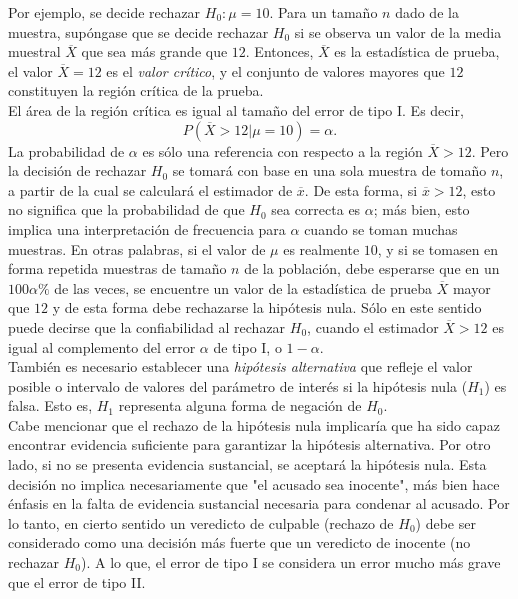 Por ejemplo, se decide rechazar $H_0:\mu =10$. Para un tamaño $n$ dado de la muestra, supóngase que se decide rechazar $H_0$ si se observa un valor de la media muestral $\overline{X}$ que sea más grande que $12$. Entonces, $\overline{X}$ es la estadística de prueba, el valor $\overline{X}=12$ es el \textit{valor crítico}, y el conjunto de valores mayores que $12$ constituyen la región crítica de la prueba. \\
El área de la región crítica es igual al tamaño del error de tipo I. Es decir,
$$P(\overline{X}>12 | \mu = 10)=\alpha.$$
La probabilidad de $\alpha$ es sólo una referencia con respecto a la región $\overline{X}>12$. Pero la decisión de rechazar $H_0$ se tomará con base en una sola muestra de tomaño $n$, a partir de la cual se calculará el estimador de $\overline{x}$. De esta forma, si $\overline{x}>12$, esto no significa que la probabilidad de que $H_0$ sea correcta es $\alpha$; más bien, esto implica una interpretación de frecuencia para $\alpha$ cuando se toman muchas muestras. En otras palabras, si el valor de $\mu$ es realmente $10$, y si se tomasen en forma repetida muestras de tamaño $n$ de la población, debe esperarse que en un $100\alpha \%$ de las veces, se encuentre un valor de la estadística de prueba $\overline{X}$ mayor que $12$ y de esta forma debe rechazarse la hipótesis nula. Sólo en este sentido puede decirse que la confiabilidad al rechazar $H_0$, cuando el estimador $\overline{X}>12$ es igual al complemento del error $\alpha$ de tipo I, o $1-\alpha$.\\

También es necesario establecer una \textit{hipótesis alternativa} que refleje el valor posible o intervalo de valores del parámetro de interés si la hipótesis nula ($H_1$) es falsa. Esto es, $H_1$ representa alguna forma de negación de $H_0$. \\

Cabe mencionar que el rechazo de la hipótesis nula implicaría que ha sido capaz encontrar evidencia suficiente para garantizar la hipótesis alternativa. Por otro lado, si no se presenta evidencia sustancial, se aceptará la hipótesis nula. Esta decisión no implica necesariamente que "el acusado sea inocente", más bien hace énfasis en la falta de evidencia sustancial necesaria para condenar al acusado. Por lo tanto, en cierto sentido un veredicto de culpable (rechazo de $H_0$) debe ser considerado como una decisión más fuerte que un veredicto de inocente (no rechazar $H_0$). A lo que, el error de tipo I se considera un error mucho más grave que el error de tipo II.\\

